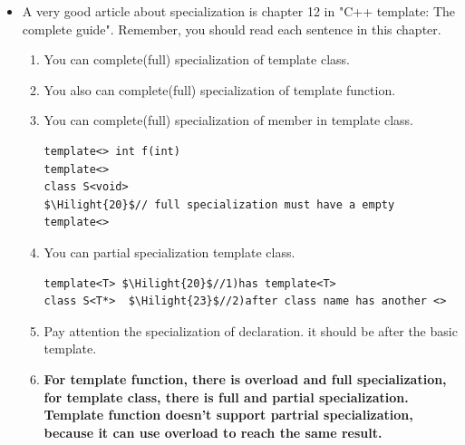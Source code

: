 \documentclass[a4paper,11pt,twoside]{book}
\newcommand{\Hilight}[1]{\makebox[0pt][l]{\color{yellow}\rule[-3pt]{#1em}{11pt}}}
\newcommand{\Hilight}[1]{}
\begin{document}
\begin{itemize}
\item A very good article about specialization is chapter 12 in "C++ template: The complete guide". Remember, you should read each sentence in this chapter.
\begin{enumerate}
	\item You can complete(full) specialization of template class. 
	\item You also can complete(full) specialization of template function. 
	\item You can complete(full) specialization of member in template class. 
\begin{lstlisting}
template<> int f(int)
template<> 
class S<void>
$\Hilight{20}$// full specialization must have a empty template<>
\end{lstlisting}
	\item You can partial specialization template class.
\begin{lstlisting}
template<T> $\Hilight{20}$//1)has template<T>
class S<T*>  $\Hilight{23}$//2)after class name has another <>
\end{lstlisting}
	\item Pay attention the specialization of declaration. it should be after the basic template.
	\item \textbf{For template function, there is overload and full specialization, for template class, there is full and partial specialization. Template function doesn't support partrial specialization, because it can use overload to reach the same result.} 
\end{enumerate}
\end{itemize}
\end{document}
